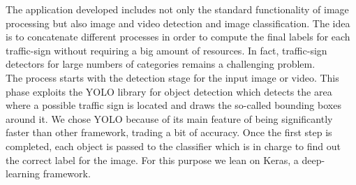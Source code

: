 The application developed includes not only the standard functionality of image processing but also image and video detection and image classification. The idea is to concatenate different processes in order to compute the final labels for each traffic-sign without requiring a big amount of resources. In fact, traffic-sign detectors for large numbers of categories remains a challenging problem.\\ The process starts with the detection stage for the input image or video. This phase exploits the YOLO library for object detection which detects the area where a possible traffic sign is located and draws the so-called bounding boxes around it. We chose YOLO because of its main feature of being significantly faster than other framework, trading a bit of accuracy. Once the first step is completed, each object is passed to the classifier which is in charge to find out the correct label for the image. For this purpose we lean on Keras, a deep-learning framework.
